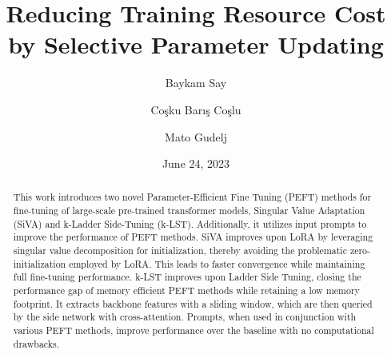\documentclass[
  english,        %
  font=times,     %
  twocolumn,      %
]{tumarticle}
\title{Reducing Training Resource Cost by Selective Parameter Updating}
\author[affil=1, email=baykam.say@tum.de]{Baykam Say}
\author[affil=1, email=baris.coslu@tum.de]{Coşku Barış Coşlu}
\author[affil=1, email=mato.gudelj@tum.de]{Mato Gudelj}
\affil[mark=1]{\theDepartmentName, \theUniversityName}
\date{June 24, 2023}
\begin{document}
\maketitle

\begin{abstract}
  This work introduces two novel Parameter-Efficient Fine Tuning (PEFT) methods for fine-tuning of large-scale pre-trained transformer models, Singular Value Adaptation (SiVA) and k-Ladder Side-Tuning (k-LST). Additionally, it utilizes input prompts to improve the performance of PEFT methods. SiVA improves upon LoRA by leveraging singular value decomposition for initialization, thereby avoiding the problematic zero-initialization employed by LoRA. This leads to faster convergence while maintaining full fine-tuning performance. k-LST improves upon Ladder Side Tuning, closing the performance gap of memory efficient PEFT methods while retaining a low memory footprint. It extracts backbone features with a sliding window, which are then queried by the side network with cross-attention. Prompts, when used in conjunction with various PEFT methods, improve performance over the baseline with no computational drawbacks.
\end{abstract}











\printbibliography
\end{document}
